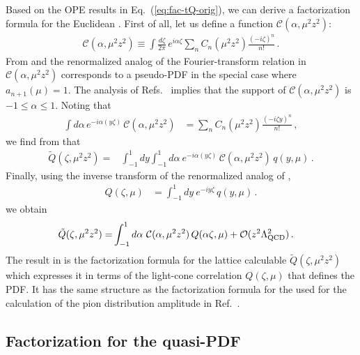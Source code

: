 Based on the OPE results in Eq.~(\ref{eq:fac-tQ-orig}), we can  derive a  factorization formula for the Euclidean \spcorr. First of all, let us
define a function $\mathcal{C} (\alpha, {\mu}^2 z^2)$:
\begin{align}  \label{eq:fac-C}
\mathcal{C} (\alpha, {\mu}^2 z^2) \equiv \int\! \frac{d \zeta}{2 \pi} \,
 e^{i \alpha \zeta}  \sum_n C_n ({\mu}^2 z^2)  \frac{(-i \zeta)^n}{n!}
 \,.
\end{align}
From  and the renormalized analog of the Fourier-transform relation in  $\mathcal{C}(\alpha,\mu^2z^2)$ corresponds to a pseudo-PDF in the special case where $a_{n+1}(\mu)=1$. The analysis of Refs.~\cite{Radyushkin:1983wh,Radyushkin:2016hsy} implies that the support of $\mathcal{C}(\alpha,\mu^2z^2)$ is $-1 \le \alpha \le 1$. Noting that
\begin{align}
  \int d\alpha\, e^{-i\alpha(y \zeta)}\, \mathcal{C} (\alpha, {\mu}^2 z^2)
   &= \sum_n C_n(\mu^2 z^2) \frac{(-i\zeta y)^n}{n!} \,,
\end{align}
we find from  that
\begin{align}
\tilde{Q}(\zeta,\mu^2 z^2)
= &\int_{-1}^1\!\! dy\int_{-1}^1\!\! d\alpha\ e^{-i\alpha(y\zeta)}\, \mathcal{C}(\alpha,\mu^2z^2)\, q(y,\mu) \,.
\end{align}
Finally, using the inverse transform of the renormalized analog of ,
\begin{align} \label{eq:FTq}
Q(\zeta,\mu) &= \int_{-1}^1\!\! dy\: e^{-i y\zeta}\,
  q(y,\mu) \,.
\end{align}
we obtain
\begin{align} \label{eq:io-Q-fact}
\tilde{Q}(\zeta,\mu^2 z^2)
=& \int_{-1}^1 d\alpha\ \mathcal{C}(\alpha,\mu^2z^2)\, Q(\alpha \zeta,\mu)
 + {\cal O}(z^2\Lambda_{\rm QCD}^2)
\,.
\end{align}
The result in  is the factorization formula for the lattice calculable \spcorr $\tilde Q(\zeta,\mu^2 z^2)$ which expresses it in terms of the light-cone correlation $Q(\zeta,\mu)$ that defines the PDF. It has the same structure as the factorization formula for the \spcorr used for the calculation of the pion distribution amplitude in Ref.~\cite{Braun:2007wv,Bali:2017gfr}.

\subsection{Factorization for the quasi-PDF}


